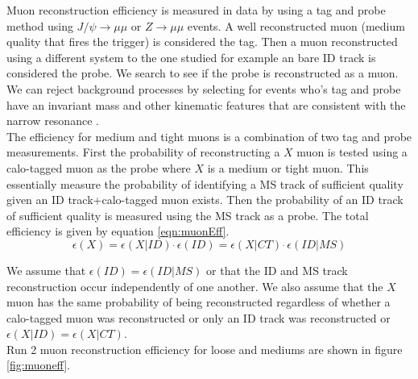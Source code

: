 \indent Muon reconstruction efficiency is measured in data by using a tag and probe method using $J/\psi\rightarrow \mu\mu$ or $Z\rightarrow\mu\mu$ events.  A well reconstructed muon (medium quality that fires the trigger) is considered the tag.  Then a muon reconstructed using a different system to the one studied for example an bare ID track is considered the probe.  We search to see if the probe is reconstructed as a muon.  We can reject background processes by selecting for events who's tag and probe have an invariant mass and other kinematic features that are consistent with the narrow resonance .  \\

\indent The efficiency for medium and tight muons is a combination of two tag and probe measurements.  First the probability of reconstructing a $X$ muon is tested using a calo-tagged muon as the probe where $X$ is a medium or tight muon.  This essentially measure the probability of identifying a MS track of sufficient quality given an ID track+calo-tagged muon exists.  Then the probability of an ID track of sufficient quality is measured using the MS track as a probe.  The total efficiency is given by equation \ref{eqn:muonEff}. \\

\begin{equation}
\epsilon (X) = \epsilon (X | ID)~\dot~\epsilon(ID) = \epsilon(X | CT)~\dot~\epsilon(ID|MS)
\label{eqn:muonEff}
\end{equation}

\indent We assume that $\epsilon(ID) = \epsilon(ID|MS)$ or that the ID and MS track reconstruction occur independently of one another.  We also assume that the $X$ muon has the same probability of being reconstructed regardless of whether a calo-tagged muon was reconstructed or only an ID track was reconstructed or $\epsilon (X | ID) = \epsilon(X | CT)$. \\

\indent Run 2 muon reconstruction efficiency for loose and mediums are shown in figure \ref{fig:muoneff}. \\

